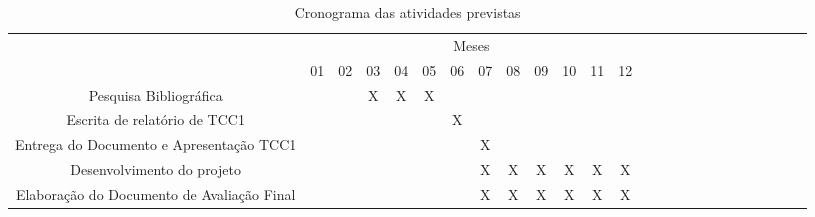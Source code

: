 \documentclass[12pt,a4paper,oneside]{report}
\begin{document}
\begin{table}[!htpb]
\centering

\begin{small} 
  
\setlength{\tabcolsep}{3pt} 


\begin{tabular}{|c|c|c|c|c|c|c|c|c|c|c|c|c|c|c|c|c|c|c|c|c|c|c|c|c|}\hline
 & \multicolumn{12}{c|}{Meses}\\ \cline{1-13}
\raisebox{1.5ex}{Etapa} & 01 & 02 & 03 & 04 & 05 & 06 & 07 & 08 & 09 & 10 & 11 & 12 \\ \hline

Pesquisa Bibliográfica &  &  & X & X & X &  &  &  &  &  &  & \\ \hline
Escrita de relatório de TCC1 &  &  &  &  &  & X &  &  &  &  &  & \\ \hline
Entrega do Documento e Apresentação TCC1 &  &  &  &  &  &  & X &  &  &  &  & \\ \hline
Desenvolvimento do projeto &  &  &  &  &  &  & X & X & X & X & X & X \\ \hline
Elaboração do Documento de Avaliação Final &  &  &  &  &  &  & X & X & X & X & X & X  \\ \hline

\end{tabular} 
\end{small}
\caption{Cronograma das atividades previstas}
\label{t_cronograma}
\end{table}


\nocite{*}



\end{document}
